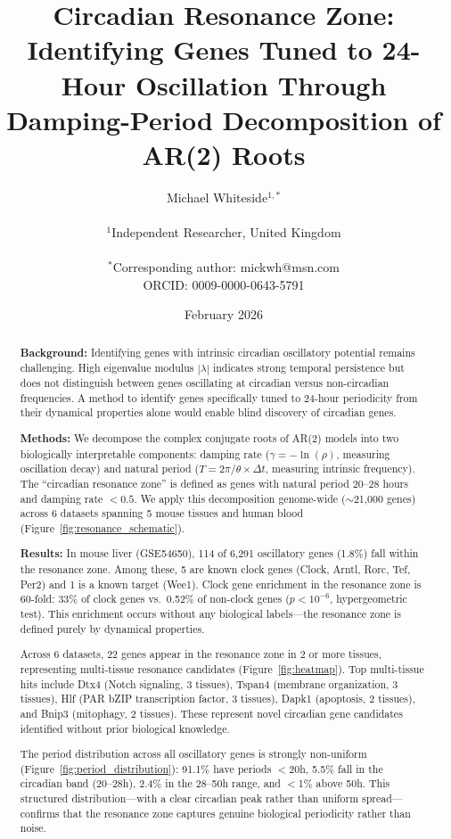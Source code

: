 \documentclass[11pt,letterpaper]{article}
\title{\textbf{Circadian Resonance Zone: Identifying Genes Tuned to 24-Hour Oscillation Through Damping-Period Decomposition of AR(2) Roots}}
\author{
Michael Whiteside$^{1,*}$ \\
\\
$^1$Independent Researcher, United Kingdom \\
\\
$^*$Corresponding author: mickwh@msn.com \\
ORCID: 0009-0000-0643-5791
}
\date{February 2026}
\begin{document}
\maketitle

\begin{abstract}
\noindent\textbf{Background:} Identifying genes with intrinsic circadian oscillatory potential remains challenging. High eigenvalue modulus $|\lambda|$ indicates strong temporal persistence but does not distinguish between genes oscillating at circadian versus non-circadian frequencies. A method to identify genes specifically tuned to 24-hour periodicity from their dynamical properties alone would enable blind discovery of circadian genes.

\noindent\textbf{Methods:} We decompose the complex conjugate roots of AR(2) models into two biologically interpretable components: damping rate ($\gamma = -\ln(\rho)$, measuring oscillation decay) and natural period ($T = 2\pi/\theta \times \Delta t$, measuring intrinsic frequency). The ``circadian resonance zone'' is defined as genes with natural period 20--28 hours and damping rate $< 0.5$. We apply this decomposition genome-wide ($\sim$21,000 genes) across 6 datasets spanning 5 mouse tissues and human blood (Figure~\ref{fig:resonance_schematic}).

\noindent\textbf{Results:} In mouse liver (GSE54650), 114 of 6,291 oscillatory genes (1.8\%) fall within the resonance zone. Among these, 5 are known clock genes (Clock, Arntl, Rorc, Tef, Per2) and 1 is a known target (Wee1). Clock gene enrichment in the resonance zone is 60-fold: 33\% of clock genes vs.\ 0.52\% of non-clock genes ($p < 10^{-6}$, hypergeometric test). This enrichment occurs without any biological labels---the resonance zone is defined purely by dynamical properties.

Across 6 datasets, 22 genes appear in the resonance zone in 2 or more tissues, representing multi-tissue resonance candidates (Figure~\ref{fig:heatmap}). Top multi-tissue hits include Dtx4 (Notch signaling, 3 tissues), Tspan4 (membrane organization, 3 tissues), Hlf (PAR bZIP transcription factor, 3 tissues), Dapk1 (apoptosis, 2 tissues), and Bnip3 (mitophagy, 2 tissues). These represent novel circadian gene candidates identified without prior biological knowledge.

The period distribution across all oscillatory genes is strongly non-uniform (Figure~\ref{fig:period_distribution}): 91.1\% have periods $<$20h, 5.5\% fall in the circadian band (20--28h), 2.4\% in the 28--50h range, and $<$1\% above 50h. This structured distribution---with a clear circadian peak rather than uniform spread---confirms that the resonance zone captures genuine biological periodicity rather than noise.


\end{abstract}
\end{document}
